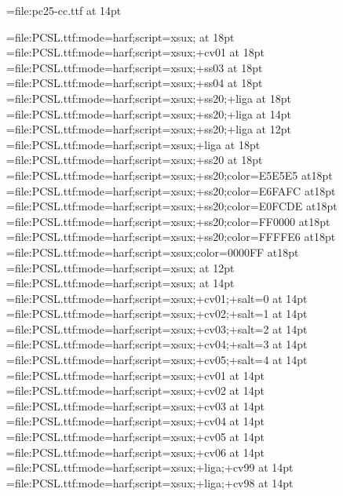 \font\pccc={file:pc25-cc.ttf} at 14pt

\font\pcxxv={file:PCSL.ttf:mode=harf;script=xsux;} at 18pt
\font\pccvi={file:PCSL.ttf:mode=harf;script=xsux;+cv01} at 18pt
\font\pcssiii={file:PCSL.ttf:mode=harf;script=xsux;+ss03} at 18pt
\font\pcssiv={file:PCSL.ttf:mode=harf;script=xsux;+ss04} at 18pt
\font\pcssXX={file:PCSL.ttf:mode=harf;script=xsux;+ss20;+liga} at 18pt
\font\pcssxx={file:PCSL.ttf:mode=harf;script=xsux;+ss20;+liga} at 14pt
\font\pcssxxx={file:PCSL.ttf:mode=harf;script=xsux;+ss20;+liga} at 12pt
\font\pcxviii={file:PCSL.ttf:mode=harf;script=xsux;+liga} at 18pt
\font\pcssxx={file:PCSL.ttf:mode=harf;script=xsux;+ss20} at 18pt
\font\pceee={file:PCSL.ttf:mode=harf;script=xsux;+ss20;color=E5E5E5} at18pt
\font\pceff={file:PCSL.ttf:mode=harf;script=xsux;+ss20;color=E6FAFC} at18pt
\font\pcefd={file:PCSL.ttf:mode=harf;script=xsux;+ss20;color=E0FCDE} at18pt
\font\pcfee={file:PCSL.ttf:mode=harf;script=xsux;+ss20;color=FF0000} at18pt
\font\pcffe={file:PCSL.ttf:mode=harf;script=xsux;+ss20;color=FFFFE6} at18pt
\font\pcblu={file:PCSL.ttf:mode=harf;script=xsux;color=0000FF} at18pt
\font\pcringop={file:PCSL.ttf:mode=harf;script=xsux;} at 12pt
\font\pcseq={file:PCSL.ttf:mode=harf;script=xsux;} at 14pt
\font\pcseqi={file:PCSL.ttf:mode=harf;script=xsux;+cv01;+salt=0} at 14pt
\font\pcseqii={file:PCSL.ttf:mode=harf;script=xsux;+cv02;+salt=1} at 14pt
\font\pcseqiii={file:PCSL.ttf:mode=harf;script=xsux;+cv03;+salt=2} at 14pt
\font\pcseqiv={file:PCSL.ttf:mode=harf;script=xsux;+cv04;+salt=3} at 14pt
\font\pcseqv={file:PCSL.ttf:mode=harf;script=xsux;+cv05;+salt=4} at 14pt
\font\pccvi={file:PCSL.ttf:mode=harf;script=xsux;+cv01} at 14pt
\font\pccvii={file:PCSL.ttf:mode=harf;script=xsux;+cv02} at 14pt
\font\pccviii={file:PCSL.ttf:mode=harf;script=xsux;+cv03} at 14pt
\font\pccviv={file:PCSL.ttf:mode=harf;script=xsux;+cv04} at 14pt
\font\pccvv={file:PCSL.ttf:mode=harf;script=xsux;+cv05} at 14pt
\font\pccvvi={file:PCSL.ttf:mode=harf;script=xsux;+cv06} at 14pt
\font\pccvxcix={file:PCSL.ttf:mode=harf;script=xsux;+liga;+cv99} at 14pt
\font\pccvxcviii={file:PCSL.ttf:mode=harf;script=xsux;+liga;+cv98} at 14pt

\endinput
